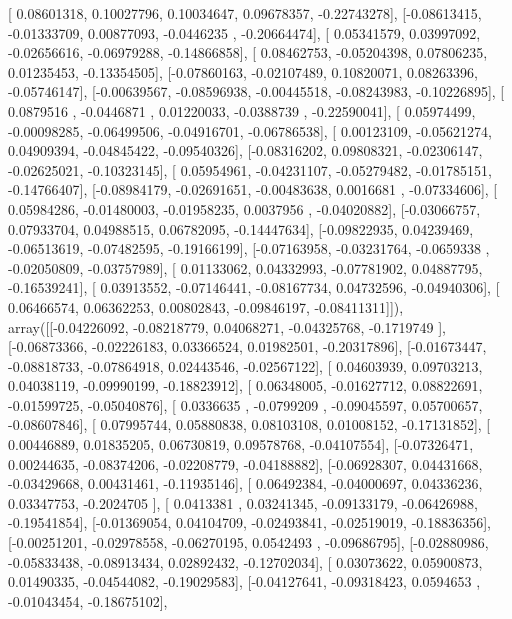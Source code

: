\documentclass{article}
\begin{document}
       [ 0.08601318,  0.10027796,  0.10034647,  0.09678357, -0.22743278],
       [-0.08613415, -0.01333709,  0.00877093, -0.0446235 , -0.20664474],
       [ 0.05341579,  0.03997092, -0.02656616, -0.06979288, -0.14866858],
       [ 0.08462753, -0.05204398,  0.07806235,  0.01235453, -0.13354505],
       [-0.07860163, -0.02107489,  0.10820071,  0.08263396, -0.05746147],
       [-0.00639567, -0.08596938, -0.00445518, -0.08243983, -0.10226895],
       [ 0.0879516 , -0.0446871 ,  0.01220033, -0.0388739 , -0.22590041],
       [ 0.05974499, -0.00098285, -0.06499506, -0.04916701, -0.06786538],
       [ 0.00123109, -0.05621274,  0.04909394, -0.04845422, -0.09540326],
       [-0.08316202,  0.09808321, -0.02306147, -0.02625021, -0.10323145],
       [ 0.05954961, -0.04231107, -0.05279482, -0.01785151, -0.14766407],
       [-0.08984179, -0.02691651, -0.00483638,  0.0016681 , -0.07334606],
       [ 0.05984286, -0.01480003, -0.01958235,  0.0037956 , -0.04020882],
       [-0.03066757,  0.07933704,  0.04988515,  0.06782095, -0.14447634],
       [-0.09822935,  0.04239469, -0.06513619, -0.07482595, -0.19166199],
       [-0.07163958, -0.03231764, -0.0659338 , -0.02050809, -0.03757989],
       [ 0.01133062,  0.04332993, -0.07781902,  0.04887795, -0.16539241],
       [ 0.03913552, -0.07146441, -0.08167734,  0.04732596, -0.04940306],
       [ 0.06466574,  0.06362253,  0.00802843, -0.09846197, -0.08411311]]), array([[-0.04226092, -0.08218779,  0.04068271, -0.04325768, -0.1719749 ],
       [-0.06873366, -0.02226183,  0.03366524,  0.01982501, -0.20317896],
       [-0.01673447, -0.08818733, -0.07864918,  0.02443546, -0.02567122],
       [ 0.04603939,  0.09703213,  0.04038119, -0.09990199, -0.18823912],
       [ 0.06348005, -0.01627712,  0.08822691, -0.01599725, -0.05040876],
       [ 0.0336635 , -0.0799209 , -0.09045597,  0.05700657, -0.08607846],
       [ 0.07995744,  0.05880838,  0.08103108,  0.01008152, -0.17131852],
       [ 0.00446889,  0.01835205,  0.06730819,  0.09578768, -0.04107554],
       [-0.07326471,  0.00244635, -0.08374206, -0.02208779, -0.04188882],
       [-0.06928307,  0.04431668, -0.03429668,  0.00431461, -0.11935146],
       [ 0.06492384, -0.04000697,  0.04336236,  0.03347753, -0.2024705 ],
       [ 0.0413381 ,  0.03241345, -0.09133179, -0.06426988, -0.19541854],
       [-0.01369054,  0.04104709, -0.02493841, -0.02519019, -0.18836356],
       [-0.00251201, -0.02978558, -0.06270195,  0.0542493 , -0.09686795],
       [-0.02880986, -0.05833438, -0.08913434,  0.02892432, -0.12702034],
       [ 0.03073622,  0.05900873,  0.01490335, -0.04544082, -0.19029583],
       [-0.04127641, -0.09318423,  0.0594653 , -0.01043454, -0.18675102],
\end{document}
